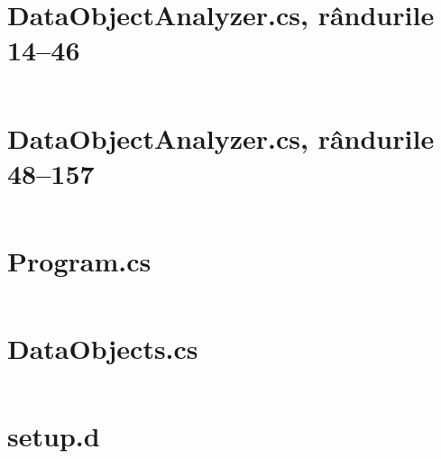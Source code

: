 \documentclass[a4paper,12pt]{report}
\begin{document}
\clearpage\section{DataObjectAnalyzer.cs, rândurile 14--46}\label{appendix:Kari____Kari_source_Kari_Plugins_DataObject_DataObjectAnalyzer_14_46}
\inputminted[firstline=14, lastline=46]{cs}{../Kari/source/Kari.Plugins/DataObject/DataObjectAnalyzer.cs}

\clearpage\section{DataObjectAnalyzer.cs, rândurile 48--157}\label{appendix:Kari____Kari_source_Kari_Plugins_DataObject_DataObjectAnalyzer_48_157}
\inputminted[firstline=48, lastline=157]{cs}{../Kari/source/Kari.Plugins/DataObject/DataObjectAnalyzer.cs}

\clearpage\section{Program.cs}\label{appendix:uni_thesis____examples_dataobject_Program}
\inputminted{cs}{../examples/dataobject/Program.cs}

\clearpage\section{DataObjects.cs}\label{appendix:uni_thesis____examples_dataobject_Generated_DataObjects}
\inputminted{cs}{../examples/dataobject/Generated/DataObjects.cs}

\clearpage\section{setup.d}\label{appendix:race____race_dev_cli_source_commands_setup}
\inputminted{d}{../race/dev_cli/source/commands/setup.d}
\end{document}
